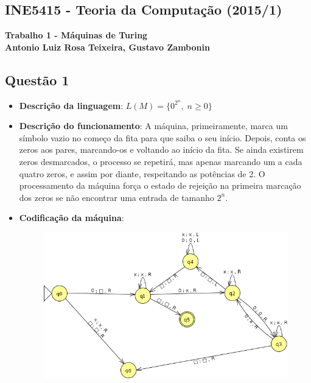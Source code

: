 \documentclass{article}
\begin{document}
\begin{center}
    \section*{INE5415 - Teoria da Computação (2015/1)}
    \textbf{
        Trabalho 1 - Máquinas de Turing \\
        Antonio Luiz Rosa Teixeira, Gustavo Zambonin
    }
\end{center}

\subsection*{Questão 1}

\begin{itemize}

    \item \textbf{Descrição da linguagem}: $L(M) = \{0^{2^{n}}, \; n \geq 0\}$

    \item \textbf{Descrição do funcionamento}: A máquina, primeiramente,
        marca um símbolo vazio no começo da fita para que saiba o seu início.
        Depois, conta os zeros aos pares, marcando-os e voltando ao início da
        fita. Se ainda existirem zeros desmarcados, o processo se repetirá,
        mas apenas marcando um a cada quatro zeros, e assim por diante,
        respeitando as potências de 2. O processamento da máquina força o
        estado de rejeição na primeira marcação dos zeros se não encontrar uma
        entrada de tamanho $2^{n}$.

    \item \textbf{Codificação da máquina}:

        \begin{figure}[htbp]
            \centering
            \includegraphics[scale=0.5]{images/questao1_ss.png}
        \end{figure}


\end{itemize}
\end{document}
